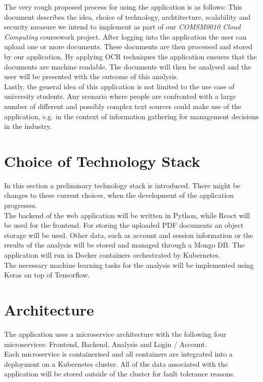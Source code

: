 \documentclass[conference]{IEEEtran}
\begin{document}
The very rough proposed process for using the application is as follows: This document describes the
idea, choice of technology, archtitecture, scalability and security measure we intend to implement as
part of our \textit{COMSM0010 Cloud Computing} coursework project. After logging into the application the user can
upload one or more documents. These documents are then processed and stored by our application. By applying
OCR techniques the application ensures that the documents are machine readable. The documents will then
be analysed and the user will be presented with the outcome of this analysis. \\

Lastly, the general idea of this application is not limited to the use case of university students.
Any scenario where people are confronted with a large number of different and possibly complex text
sources could make use of the application, e.g. in the context of information gathering for management
decisions in the industry.

\section{Choice of Technology Stack}
In this section a  preliminary technology stack is introduced. There might be changes to these current
choices, when the development of the application progresses. \\

The backend of the web application will be written in Python, while React will be used for the frontend.
For storing the uploaded PDF documents an object storage will be used. Other data, such as account and
session information or the results of the analysis will be stored and managed through a Mongo DB.
The application will run in Docker containers orchestrated by Kubernetes. \\

The necessary machine learning tasks for the analysis will be implemented using Keras on top of Tensorflow.

\section{Architecture}
The application uses a microservice architecture with the following four microservices: Frontend, Backend,
Analysis and Login / Account. \\
Each microservice is containerised and all containers are integrated into a deployment on a Kubernetes cluster.
All of the data associated with the application will be stored outside of the cluster for fault tolerance
reasons.
\end{document}
